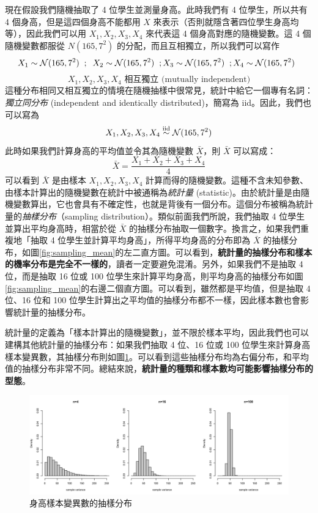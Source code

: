     現在假設我們隨機抽取了 4 位學生並測量身高。此時我們有 4 位學生，所以共有 4 個身高，但是這四個身高不能都用 $X$ 來表示（否則就隱含著四位學生身高均等），因此我們可以用 $X_1, X_2, X_3, X_4$ 來代表這 4 個身高對應的隨機變數。這 4 個隨機變數都服從 $N(165, 7 ^2)$ 的分配，而且互相獨立，所以我們可以寫作
    \[X_1 \sim \mathcal{N}(165, 7^2)\;\; ; \;\;X_2 \sim \mathcal{N}(165, 7^2)\;\; ;X_3 \sim \mathcal{N}(165, 7^2)\;\; ;X_4 \sim \mathcal{N}(165, 7^2)\;\;\]
    \[X_1,X_2,X_3,X_4\text{ 相互獨立 (mutually independent)}\]
    這種分布相同又相互獨立的情境在隨機抽樣中很常見，統計中給它一個專有名詞：\textit{獨立同分布} (independent and identically distributed)，簡寫為 iid。因此，我們也可以寫為
    \[X_1, X_2, X_3, X_4 \overset{\text{iid}}{\sim} \mathcal{N}(165, 7^2)\]
    此時如果我們計算身高的平均值並令其為隨機變數 $\bar{X}$，則 $\bar{X}$ 可以寫成：
    \[\bar{X} = \frac{X_1+X_2+X_3+X_4}{4}\]
    可以看到 $\bar{X}$ 是由樣本 $X_1,X_2,X_3,X_4$ 計算而得的隨機變數。這種不含未知參數、由樣本計算出的隨機變數在統計中被通稱為\textit{統計量} (statistic)。由於統計量是由隨機變數算出，它也會具有不確定性，也就是背後有一個分布。這個分布被稱為統計量的\textit{抽樣分布}（sampling distribution）。類似前面我們所說，我們抽取 4 位學生並算出平均身高時，相當於從 $\bar{X}$ 的抽樣分布抽取一個數字。換言之，如果我們重複地「抽取 4 位學生並計算平均身高」，所得平均身高的分布即為 $\bar{X}$ 的抽樣分布，如圖\ref{fig:sampling_mean}的左二直方圖。可以看到，\textbf{統計量的抽樣分布和樣本的機率分布是完全不一樣的}，讀者一定要避免混淆。另外，如果我們不是抽取 4 位，而是抽取 16 位或 100 位學生來計算平均身高，則平均身高的抽樣分布如圖\ref{fig:sampling_mean}的右邊二個直方圖。可以看到，雖然都是平均值，但是抽取 4 位、16 位和 100 位學生計算出之平均值的抽樣分布都不一樣，因此樣本數也會影響統計量的抽樣分布。
    
    統計量的定義為「樣本計算出的隨機變數」，並不限於樣本平均，因此我們也可以建構其他統計量的抽樣分布：如果我們抽取 4 位、16 位或 100 位學生來計算身高樣本變異數，其抽樣分布則如圖\ref{fig:sampling_var}。可以看到這些抽樣分布均為右偏分布，和平均值的抽樣分布非常不同。總結來說，\textbf{統計量的種類和樣本數均可能影響抽樣分布的型態}。

    \begin{figure}[htbp]
        \centering
        \includegraphics[width=\textwidth]{figures/04-Sampling_distribution_CLT/sampling_var.png}
        \caption{身高樣本變異數的抽樣分布}
        \label{fig:sampling_var}
    \end{figure}

